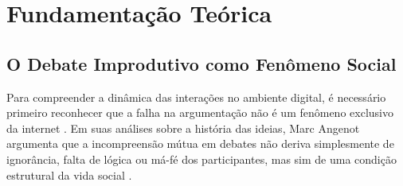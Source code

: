 \documentclass[conference]{IEEEtran} \IEEEoverridecommandlockouts %
\begin{document}
\section{Fundamentação Teórica}

\subsection{O Debate Improdutivo como Fenômeno Social}

\label{sec:debate-improdutivo}

Para compreender a dinâmica das interações no ambiente digital, é necessário primeiro reconhecer que a falha na argumentação não é um fenômeno exclusivo da internet \cite{angenot2008dialogues}. Em suas análises sobre a história das ideias, Marc Angenot argumenta que a incompreensão mútua em debates não deriva simplesmente de ignorância, falta de lógica ou má-fé dos participantes, mas sim de uma condição estrutural da vida social \cite{angenot2008dialogues,angenot2006divergent}. 




\end{document}
